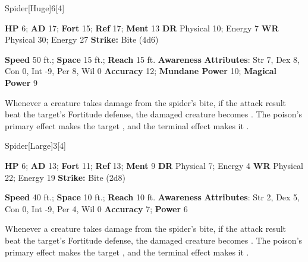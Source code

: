   \begin{monsection}{Spider}[Huge]{6}[4]
    \vspace{-1em}\vspace{-1em}
    \begin{spellcontent}
      \begin{spelltargetinginfo}
        \pari \textbf{HP} 6;
          \textbf{AD} 17;
          \textbf{Fort} 15;
          \textbf{Ref} 17;
          \textbf{Ment} 13
        \pari \textbf{DR} Physical 10; Energy 7
        \pari \textbf{WR} Physical 30; Energy 27
        \pari \textbf{Strike:}
            Bite  (4d6)
      \end{spelltargetinginfo}
    \end{spellcontent}
    \begin{monsterfooter}
      \pari \textbf{Speed} 50 ft.;
        \textbf{Space} 15 ft.;
        \textbf{Reach} 15 ft.
      \pari \textbf{Awareness} 
      \pari \textbf{Attributes}:
        Str 7, Dex 8, Con 0,
        Int -9, Per 8, Wil 0
      \pari \textbf{Accuracy} 12;
        \textbf{Mundane Power} 10;
      \textbf{Magical Power} 9
    \end{monsterfooter}
  \end{monsection}
        Whenever a creature takes damage from the spider's bite,
          if the attack result beat the target's Fortitude defense,
          the damaged creature becomes .
        The poison's primary effect makes the target ,
          and the terminal effect makes it .
  
  \begin{monsection}{Spider}[Large]{3}[4]
    \vspace{-1em}\vspace{-1em}
    \begin{spellcontent}
      \begin{spelltargetinginfo}
        \pari \textbf{HP} 6;
          \textbf{AD} 13;
          \textbf{Fort} 11;
          \textbf{Ref} 13;
          \textbf{Ment} 9
        \pari \textbf{DR} Physical 7; Energy 4
        \pari \textbf{WR} Physical 22; Energy 19
        \pari \textbf{Strike:}
            Bite  (2d8)
      \end{spelltargetinginfo}
    \end{spellcontent}
    \begin{monsterfooter}
      \pari \textbf{Speed} 40 ft.;
        \textbf{Space} 10 ft.;
        \textbf{Reach} 10 ft.
      \pari \textbf{Awareness} 
      \pari \textbf{Attributes}:
        Str 2, Dex 5, Con 0,
        Int -9, Per 4, Wil 0
      \pari \textbf{Accuracy} 7;
        \textbf{Power} 6
    \end{monsterfooter}
  \end{monsection}
        Whenever a creature takes damage from the spider's bite,
          if the attack result beat the target's Fortitude defense,
          the damaged creature becomes .
        The poison's primary effect makes the target ,
          and the terminal effect makes it .
  
